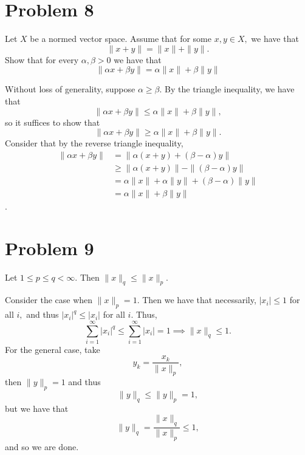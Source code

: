 \documentclass[11pt]{article}
\begin{document}
\begin{problem}
\begin{enumerate}
\newpage
\section*{Problem 8}
\begin{problem}
    Let $X$ be a normed vector space. Assume that for some $x,y \in X,$ we have that 
    \[\|x + y\| = \|x\| + \|y\|.\] Show that for every $\alpha, \beta >0$ we have that 
    \[\|\alpha x + \beta y\| = \alpha\| x\| +\beta \| y\|\]
    \end{problem}
\begin{solution}
    Without loss of generality, suppose $\alpha \geq \beta.$ By the triangle inequality, we have that 
    \[\|\alpha x + \beta y\| \leq \alpha\| x\| +\beta \| y\|,\] so it suffices to show that 
    \[\|\alpha x + \beta y\| \geq \alpha\| x\| +\beta \| y\|.\] Consider that by the reverse triangle inequality,
    \begin{align*}
        \|\alpha x + \beta y\| &= \|\alpha (x + y) + (\beta - \alpha)y\|\\
        &\geq \|\alpha (x + y)\| - \|(\beta - \alpha)y\|\\
        &=\alpha\|x\|+ \alpha\|y\| + (\beta - \alpha)\|y\|\\
        &= \alpha\|x\| + \beta \|y\|
    \end{align*}.
\end{solution}

\newpage
\section*{Problem 9}
\begin{problem}
    Let $1\leq p \leq q < \infty.$ Then $\|x\|_q \leq \|x\|_p.$
\end{problem}
\begin{solution}
Consider the case when $\|x\|_p = 1.$ Then we have that necessarily, $|x_i| \leq 1$ for all $i,$ and thus $|x_i|^q \leq |x_i|$ for all $i.$ Thus, 
\[\sum_{i=1}^\infty |x_i|^q \leq \sum_{i=1}^\infty |x_i| =1 \implies \|x\|_q \leq 1.\] For the general case, take 
\[y_k = \frac{x_k}{\|x\|_p},\] then $\|y\|_p = 1$ and thus 
\[\|y\|_q \leq \|y\|_p = 1,\] but we have that 
\[\|y\|_q = \frac{\|x\|_q}{\|x\|_p} \leq 1,\] and so we are done.
\end{solution}

\end{enumerate}

\newpage

\end{problem}
\end{document}
